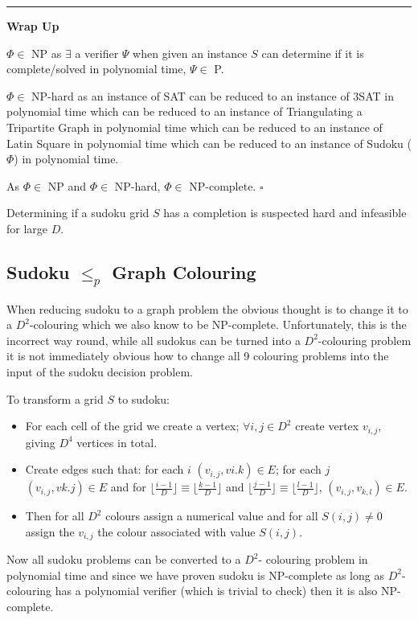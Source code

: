 \documentclass[a4paper,11pt]{report}
\newcounter{col}
\begin{document}
\noindent\rule{4cm}{0.4pt}

\textbf{Wrap Up} 

$\Phi\in $ NP as $\exists$ a verifier $\Psi$ when given an instance $S$ can determine if it is complete/solved in polynomial time, $\Psi\in$ P.

$\Phi\in $ NP-hard as an instance of SAT can be reduced to an instance of 3SAT in polynomial time which can be reduced to an instance of Triangulating a Tripartite Graph in polynomial time which can be reduced to an instance of Latin Square in polynomial time which can be reduced to an instance of Sudoku ($\Phi$) in polynomial time.

As $\Phi\in$ NP and $\Phi\in$ NP-hard, $\Phi\in$ NP-complete. $\square$

Determining if a sudoku grid $S$ has a completion is suspected hard and infeasible for large $D$.

\subsection{Sudoku $\leq_p$  Graph Colouring}

When reducing sudoku to a graph problem the obvious thought is to change it to a $D^2$-colouring which we also know to be NP-complete. Unfortunately, this is the incorrect way round, while all sudokus can be turned into a $D^2$-colouring problem it is not immediately obvious how to change all 9 colouring problems into the input of the sudoku decision problem. 

To transform a grid $S$ to sudoku:
\begin{itemize}
\item For each cell of the grid we create a vertex; $\forall i,j\in D^2$ create vertex $v_{i,j}$, giving $D^4$ vertices in total.
\item Create edges such that: for each $i$ $(v_{i,j},v{i.k})\in E$; for each $j$ $(v_{i,j},v{k.j})\in E$ and for $\lfloor\frac{i-1}{D}\rfloor\equiv\lfloor\frac{k-1}{D}\rfloor$ and $\lfloor\frac{j-1}{D}\rfloor\equiv\lfloor\frac{l-1}{D}\rfloor$, $(v_{i,j},v_{k,l})\in E$.
\item Then for all $D^2$ colours assign a numerical value and for all $S(i,j)\neq 0$ assign the $v_{i,j}$ the colour associated with value $S(i,j)$.
\end{itemize}

Now all sudoku problems can be converted to a $D^2$- colouring problem in polynomial time and since we have proven sudoku is NP-complete as long as $D^2$- colouring has a polynomial verifier (which is trivial to check) then it is also NP-complete.  
\end{document}
